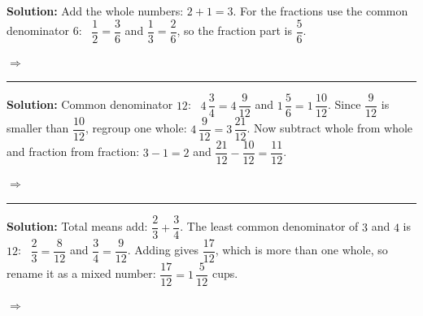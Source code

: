 \documentclass[12pt]{article}
\begin{document}

\textbf{Solution:} Add the whole numbers: $2 + 1 = 3$. For the fractions use the common denominator $6$: \ $\dfrac{1}{2} = \dfrac{3}{6}$ and $\dfrac{1}{3} = \dfrac{2}{6}$, so the fraction part is $\dfrac{5}{6}$.

$\Rightarrow$ 

\vspace{0.15cm}\noindent\rule{\linewidth}{0.2pt}


\textbf{Solution:} Common denominator $12$: \ $4\,\dfrac{3}{4} = 4\,\dfrac{9}{12}$ and $1\,\dfrac{5}{6} = 1\,\dfrac{10}{12}$. Since $\dfrac{9}{12}$ is smaller than $\dfrac{10}{12}$, regroup one whole: $4\,\dfrac{9}{12} = 3\,\dfrac{21}{12}$. Now subtract whole from whole and fraction from fraction: $3 - 1 = 2$ and $\dfrac{21}{12} - \dfrac{10}{12} = \dfrac{11}{12}$.

$\Rightarrow$ 

\vspace{0.15cm}\noindent\rule{\linewidth}{0.2pt}


\textbf{Solution:} Total means add: $\dfrac{2}{3} + \dfrac{3}{4}$. The least common denominator of $3$ and $4$ is $12$: \ $\dfrac{2}{3} = \dfrac{8}{12}$ and $\dfrac{3}{4} = \dfrac{9}{12}$. Adding gives $\dfrac{17}{12}$, which is more than one whole, so rename it as a mixed number: $\dfrac{17}{12} = 1\,\dfrac{5}{12}$ cups.

$\Rightarrow$ 
\end{document}
